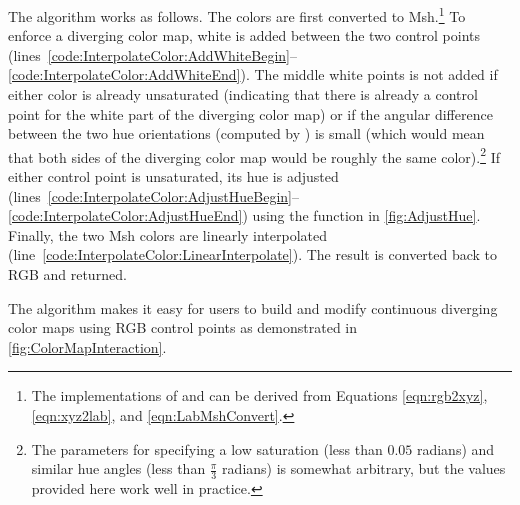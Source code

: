 \documentclass{llncs}
\newcommand{\RGB}{RGB\xspace}
\newcommand{\Msh}{Msh\xspace}
\begin{document}
{The  algorithm works as follows.  The colors are
first converted to \Msh.\footnote{The implementations of  and
 can be derived from Equations \ref{eqn:rgb2xyz},
\ref{eqn:xyz2lab}, and \ref{eqn:LabMshConvert}.}  To enforce
a diverging color map, white is added between the two control points
(lines~\ref{code:InterpolateColor:AddWhiteBegin}--\ref{code:InterpolateColor:AddWhiteEnd}).
The middle white points is not added if either color is already unsaturated
(indicating that there is already a control point for the white part of the
diverging color map) or if the angular difference between the two hue
orientations (computed by ) is small (which would mean that
both sides of the diverging color map would be roughly the same
color).\footnote{The parameters for specifying a low saturation (less than
$0.05$ radians) and similar hue angles (less than $\frac{\pi}{3}$ radians)
is somewhat arbitrary, but the values provided here work well in practice.}
If either control point is unsaturated, its hue is adjusted
(lines~\ref{code:InterpolateColor:AdjustHueBegin}--\ref{code:InterpolateColor:AdjustHueEnd})
using the  function in \autoref{fig:AdjustHue}.
Finally, the two \Msh colors are linearly interpolated
(line~\ref{code:InterpolateColor:LinearInterpolate}).  The result is
converted back to \RGB and returned.

The  algorithm makes it easy for users to build and
modify continuous diverging color maps using \RGB control points as
demonstrated in \autoref{fig:ColorMapInteraction}.

}
\end{document}
